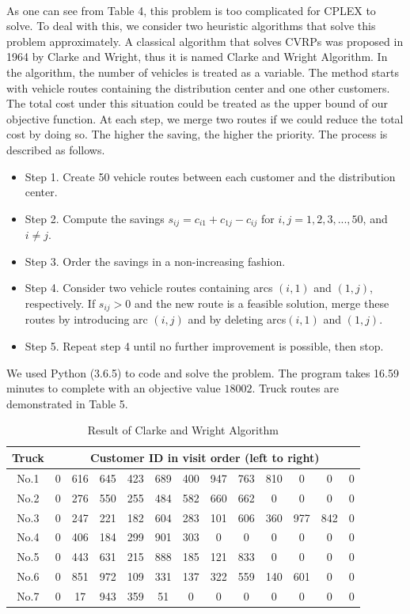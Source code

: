 \documentclass[12pt]{article}
\numberwithin{equation}{section}
\begin{document}
	\paragraph{}As one can see from Table 4, this problem is too complicated for CPLEX to solve. To deal with this, we consider two heuristic algorithms that solve this problem approximately. A classical algorithm that solves CVRPs was proposed in 1964 by Clarke and Wright, thus it is named Clarke and Wright Algorithm. In the algorithm, the number of vehicles is treated as a variable. The method starts with vehicle routes containing the distribution center and one other customers. The total cost under this situation could be treated as the upper bound of our objective function. At each step, we merge two routes if we could reduce the total cost by doing so. The higher the saving, the higher the priority. The process is described as follows.
	\begin{itemize}
	\item[] Step 1. Create 50 vehicle routes between each customer and the distribution center.
	\item[] Step 2. Compute the savings $s_{ij}=c_{i1}+c_{1j}-c_{ij}$ for $i,j = 1,2,3,...,50$, and $i \neq j$.
	\item[] Step 3. Order the savings in a non-increasing fashion.
	\item[] Step 4. Consider two vehicle routes containing arcs $(i,1)$ and $(1,j)$, respectively. If $s_{ij}>0$ and the new route is a feasible solution, merge these routes by introducing arc $(i,j)$ and by deleting arcs$(i,1)$ and $(1,j)$.
	\item[] Step 5. Repeat step 4 until no further improvement is possible, then stop.
	\end{itemize}
We used Python (3.6.5) to code and solve the problem. The program takes 16.59 minutes to complete with an objective value $18002$. Truck routes are demonstrated in Table 5.
	
	\begin{table}[htbp]
	\centering
	\caption{Result of Clarke and Wright Algorithm}
	\begin{tabular}{c|cccccccccccc}
	\hline
	Truck & \multicolumn{12}{c}{Customer ID in visit order (left to right)}\\
	\hline
	No.1 & 0 & 616 & 645 & 423 & 689 & 400 & 947 & 763 & 810 & 0 & 0 & 0\\
	No.2 & 0 & 276 & 550 & 255 & 484 & 582 & 660 & 662 & 0 & 0 & 0 & 0\\
	No.3 & 0 & 247 & 221 & 182 & 604 & 283 & 101 & 606 & 360 & 977 & 842 & 0 \\
	No.4 & 0 & 406 & 184 & 299 & 901 & 303 & 0 & 0 & 0 & 0 & 0 & 0 \\
	No.5 & 0 & 443 & 631 & 215 & 888 & 185 & 121 & 833 & 0 & 0 & 0 & 0\\
	No.6 & 0 & 851 & 972 & 109 & 331 & 137 & 322 & 559 & 140 & 601 & 0 & 0\\
	No.7 & 0 & 17 & 943 & 359 & 51 & 0 & 0 & 0 & 0 & 0 & 0 & 0\\
	\hline
	\end{tabular}
	\end{table}
	
\end{document}
